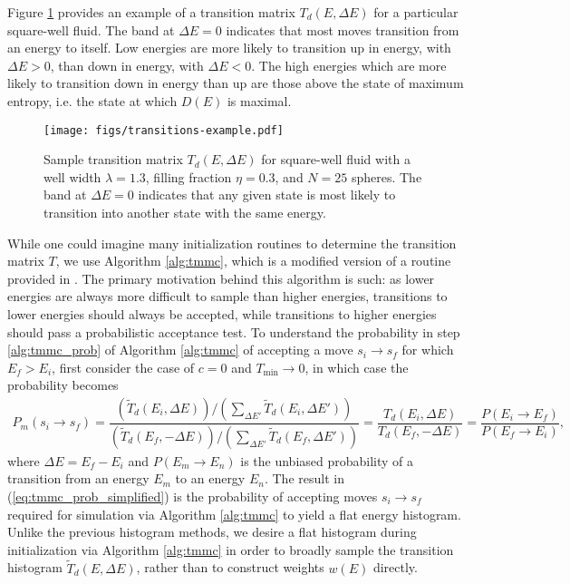\documentclass[11pt]{article}
\renewcommand{\t}{\text} %
\newcommand{\f}[2]{\dfrac{#1}{#2}} %
\newcommand{\p}[1]{\left(#1\right)} %
\begin{document}
Figure \ref{fig:transitions_sample} provides an example of a
transition matrix $T_d\p{E,\Delta E}$ for a particular square-well
fluid. The band at $\Delta E=0$ indicates that most moves transition
from an energy to itself. Low energies are more likely to transition
up in energy, with $\Delta E>0$, than down in energy, with $\Delta
E<0$. The high energies which are more likely to transition down in
energy than up are those above the state of maximum entropy, i.e. the
state at which $D\p{E}$ is maximal.

\begin{figure}
  \centering
  \texttt{[image: figs/transitions-example.pdf]}
  \caption[Transition matrix]
  {Sample transition matrix $T_d\p{E,\Delta E}$ for square-well fluid
    with a well width $\lambda=1.3$, filling fraction $\eta=0.3$, and
    $N=25$ spheres.  The band at $\Delta E=0$ indicates that any given
    state is most likely to transition into another state with the
    same energy.}
  \label{fig:transitions_sample}
\end{figure}

While one could imagine many initialization routines to determine the
transition matrix $T$, we use Algorithm \ref{alg:tmmc}, which is a
modified version of a routine provided in
\cite{wang2002transition}. The primary motivation behind this
algorithm is such: as lower energies are always more difficult to
sample than higher energies, transitions to lower energies should
always be accepted, while transitions to higher energies should pass a
probabilistic acceptance test. To understand the probability in step
\ref{alg:tmmc_prob} of Algorithm \ref{alg:tmmc} of accepting a move
$s_i\to s_f$ for which $E_f>E_i$, first consider the case of $c=0$ and
$T_{\t{min}}\to0$, in which case the probability becomes
\begin{align}
  P_m\p{s_i\to s_f}=\f{\p{\tilde T_d\p{E_i,\Delta E}}\big/
    \p{\sum_{\Delta E'}\tilde T_d\p{E_i,\Delta E'}}} {\p{\tilde
      T_d\p{E_f,-\Delta E}}\big/ \p{\sum_{\Delta E'}\tilde
      T_d\p{E_f,\Delta E'}}} =\f{T_d\p{E_i,\Delta
      E}}{T_d\p{E_f,-\Delta E}} =\f{P\p{E_i\to E_f}}{P\p{E_f\to E_i}},
  \label{eq:tmmc_prob_simplified}
\end{align}
where $\Delta E=E_f-E_i$ and $P\p{E_m\to E_n}$ is the unbiased
probability of a transition from an energy $E_m$ to an energy
$E_n$. The result in (\ref{eq:tmmc_prob_simplified}) is the
probability of accepting moves $s_i\to s_f$ required for simulation
via Algorithm \ref{alg:tmmc} to yield a flat energy
histogram\cite{wang2002transition}. Unlike the previous histogram
methods, we desire a flat histogram during initialization via
Algorithm \ref{alg:tmmc} in order to broadly sample the transition
histogram $\tilde T_d\p{E,\Delta E}$, rather than to construct weights
$w\p{E}$ directly.
\end{document}
